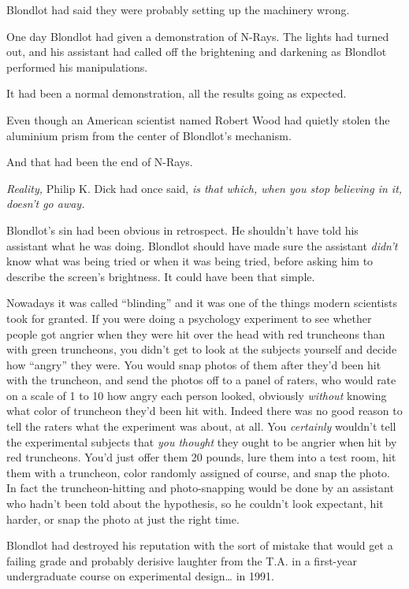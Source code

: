 Blondlot had said they were probably setting up the machinery wrong.

One day Blondlot had given a demonstration of N-Rays. The lights had
turned out, and his assistant had called off the brightening and
darkening as Blondlot performed his manipulations.

It had been a normal demonstration, all the results going as expected.

Even though an American scientist named Robert Wood had quietly stolen
the aluminium prism from the center of Blondlot's mechanism.

And that had been the end of N-Rays.

\emph{Reality,} Philip K. Dick had once said, \emph{is that which, when
you stop believing in it, doesn't go away.}

Blondlot's sin had been obvious in retrospect. He shouldn't have told
his assistant what he was doing. Blondlot should have made sure the
assistant \emph{didn't} know what was being tried or when it was being
tried, before asking him to describe the screen's brightness. It could
have been that simple.

Nowadays it was called ``blinding'' and it was one of the things modern
scientists took for granted. If you were doing a psychology experiment
to see whether people got angrier when they were hit over the head with
red truncheons than with green truncheons, you didn't get to look at the
subjects yourself and decide how ``angry'' they were. You would snap
photos of them after they'd been hit with the truncheon, and send the
photos off to a panel of raters, who would rate on a scale of 1 to 10
how angry each person looked, obviously \emph{without} knowing what
color of truncheon they'd been hit with. Indeed there was no good reason
to tell the raters what the experiment was about, at all. You
\emph{certainly} wouldn't tell the experimental subjects that \emph{you
thought} they ought to be angrier when hit by red truncheons. You'd just
offer them 20 pounds, lure them into a test room, hit them with a
truncheon, color randomly assigned of course, and snap the photo. In
fact the truncheon-hitting and photo-snapping would be done by an
assistant who hadn't been told about the hypothesis, so he couldn't look
expectant, hit harder, or snap the photo at just the right time.

Blondlot had destroyed his reputation with the sort of mistake that
would get a failing grade and probably derisive laughter from the T.A.
in a first-year undergraduate course on experimental design\ldots{} in
1991.

